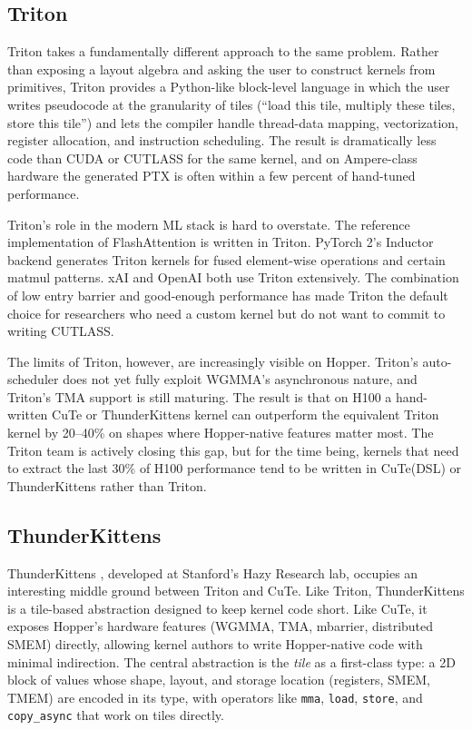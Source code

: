 \documentclass[10pt]{article}
\begin{document}
\subsection{Triton}
\label{sec:matmul-triton}

Triton \citep{tillet2019triton} takes a fundamentally different approach to the same problem. Rather than exposing a layout algebra and asking the user to construct kernels from primitives, Triton provides a Python-like block-level language in which the user writes pseudocode at the granularity of tiles (``load this tile, multiply these tiles, store this tile'') and lets the compiler handle thread-data mapping, vectorization, register allocation, and instruction scheduling. The result is dramatically less code than CUDA or CUTLASS for the same kernel, and on Ampere-class hardware the generated PTX is often within a few percent of hand-tuned performance.

Triton's role in the modern ML stack is hard to overstate. The reference implementation of FlashAttention \citep{dao2022flashattention} is written in Triton. PyTorch 2's Inductor backend generates Triton kernels for fused element-wise operations and certain matmul patterns. xAI and OpenAI both use Triton extensively. The combination of low entry barrier and good-enough performance has made Triton the default choice for researchers who need a custom kernel but do not want to commit to writing CUTLASS.

The limits of Triton, however, are increasingly visible on Hopper. Triton's auto-scheduler does not yet fully exploit WGMMA's asynchronous nature, and Triton's TMA support is still maturing. The result is that on H100 a hand-written CuTe or ThunderKittens kernel can outperform the equivalent Triton kernel by 20--40\% on shapes where Hopper-native features matter most. The Triton team is actively closing this gap, but for the time being, kernels that need to extract the last 30\% of H100 performance tend to be written in CuTe(DSL) or ThunderKittens rather than Triton.

\subsection{ThunderKittens}
\label{sec:matmul-tk}

ThunderKittens \citep{spector2024thunderkittens}, developed at Stanford's Hazy Research lab, occupies an interesting middle ground between Triton and CuTe. Like Triton, ThunderKittens is a tile-based abstraction designed to keep kernel code short. Like CuTe, it exposes Hopper's hardware features (WGMMA, TMA, mbarrier, distributed SMEM) directly, allowing kernel authors to write Hopper-native code with minimal indirection. The central abstraction is the \emph{tile} as a first-class type: a 2D block of values whose shape, layout, and storage location (registers, SMEM, TMEM) are encoded in its type, with operators like \texttt{mma}, \texttt{load}, \texttt{store}, and \texttt{copy\_async} that work on tiles directly.
\end{document}
